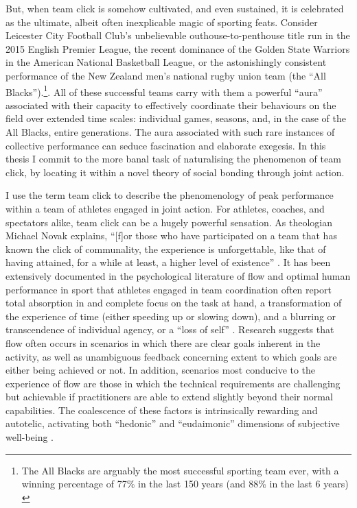 \begin{CJK}{UTF8}{gbsn}
But, when team click is somehow cultivated, and even sustained, it is celebrated as the ultimate, albeit often inexplicable magic of sporting feats. Consider Leicester City Football Club's unbelievable outhouse-to-penthouse title run in the 2015 English Premier League, the recent dominance of the Golden State Warriors in the American National Basketball League, or the astonishingly consistent performance of the New Zealand men's national rugby union team (the ``All Blacks'').\footnote{The All Blacks are arguably the most successful sporting team ever, with a winning percentage of 77\% in the last 150 years (and 88\% in the last 6 years) \citep{SOURCE}}.  All of these successful teams carry with them a powerful ``aura'' associated with their capacity to effectively coordinate their behaviours on the field over extended time scales: individual games, seasons, and, in the case of the All Blacks, entire generations.  The aura associated with such rare instances of collective performance can seduce fascination and elaborate exegesis.  In this thesis I commit to the more banal task of naturalising the phenomenon of team click, by locating it within a novel theory of social bonding through joint action.

I use the term team click to describe the phenomenology of peak performance within a team of athletes engaged in joint action.  For athletes, coaches, and spectators alike, team click can be a hugely powerful sensation. As theologian Michael Novak explains, ``[f]or those who have participated on a team that has known the click of communality, the experience is unforgettable, like that of having attained, for a while at least, a higher level of existence'' \citep[11]{White2011}. It has been extensively documented in the psychological literature of flow and optimal human performance in sport that athletes engaged in team coordination often report total absorption in and complete focus on the task at hand, a transformation of the experience of time (either speeding up or slowing down), and a blurring or transcendence of individual agency, or a ``loss of self''   \citep{Csikszentmihalyi1992,Jackson1995,Jackson1999,McNeill1995}.  Research suggests that flow often occurs in scenarios in which there are clear goals inherent in the activity, as well as unambiguous feedback concerning extent to which goals are either being achieved or not.  In addition, scenarios most conducive to the experience of flow are those in which the technical requirements are challenging but achievable if practitioners are able to extend slightly beyond their normal capabilities\citep{Fong2015}.
The coalescence of these factors is intrinsically rewarding and autotelic\citep{Csikszentmihalyi1975}, activating both ``hedonic'' and ``eudaimonic'' dimensions of subjective well-being \citep{Huta2010,Fave2009}.


\end{CJK}
